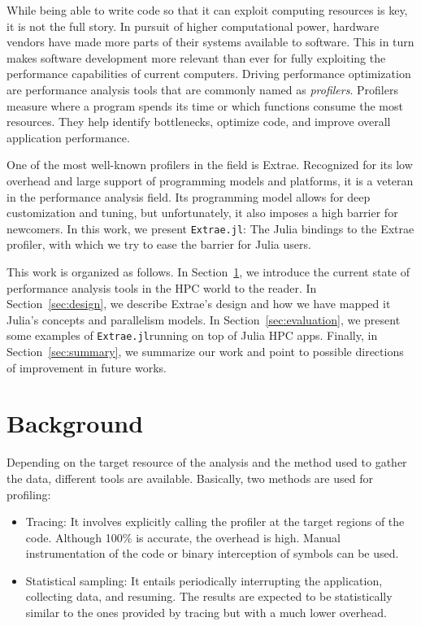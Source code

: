 \documentclass{juliacon}
\newcommand{\jlpkg}[1]{\texttt{#1}}
\newcommand{\extraejl}{\jlpkg{Extrae.jl}}
\begin{document}
While being able to write code so that it can exploit computing resources is key, it is not the full story.
In pursuit of higher computational power, hardware vendors have made more parts of their systems available to software.
This in turn makes software development more relevant than ever for fully exploiting the performance capabilities of current computers.
Driving performance optimization are performance analysis tools that are commonly named as \textit{profilers}.
Profilers measure where a program spends its time or which functions consume the most resources.
They help identify bottlenecks, optimize code, and improve overall application performance.

One of the most well-known profilers in the field is Extrae.
Recognized for its low overhead and large support of programming models and platforms, it is a veteran in the performance analysis field.
Its programming model allows for deep customization and tuning, but unfortunately, it also imposes a high barrier for newcomers.
In this work, we present \extraejl: The Julia bindings to the Extrae profiler, with which we try to ease the barrier for Julia users.

This work is organized as follows.
In Section~\ref{sec:background}, we introduce the current state of performance analysis tools in the HPC world to the reader.
In Section~\ref{sec:design}, we describe Extrae's design and how we have mapped it Julia's concepts and parallelism models.
In Section~\ref{sec:evaluation}, we present some examples of \extraejl running on top of Julia HPC apps.
Finally, in Section~\ref{sec:summary}, we summarize our work and point to possible directions of improvement in future works.

\section{Background}\label{sec:background}

Depending on the target resource of the analysis and the method used to gather the data, different tools are available.
Basically, two methods are used for profiling:

\begin{itemize}
\item Tracing: It involves explicitly calling the profiler at the target regions of the code. Although 100\% is accurate, the overhead is high. Manual instrumentation of the code or binary interception of symbols can be used.
\item Statistical sampling: It entails periodically interrupting the application, collecting data, and resuming. The results are expected to be statistically similar to the ones provided by tracing but with a much lower overhead.
\end{itemize}
\end{document}
